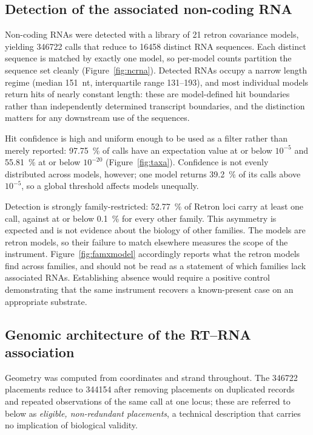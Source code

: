 \subsection{Detection of the associated non-coding RNA}
\label{sec:dbchar:ncrna}

Non-coding RNAs were detected with a library of 21 retron covariance models, yielding \num{346722}
calls that reduce to \num{16458} distinct RNA sequences. Each distinct sequence is matched by
exactly one model, so per-model counts partition the sequence set cleanly
(Figure~\ref{fig:ncrna}). Detected RNAs occupy a narrow length regime (median 151~nt, interquartile
range 131--193), and most individual models return hits of nearly constant length: these are
model-defined hit boundaries rather than independently determined transcript boundaries, and the
distinction matters for any downstream use of the sequences.

Hit confidence is high and uniform enough to be used as a filter rather than merely reported:
\SI{97.75}{\percent} of calls have an expectation value at or below $10^{-5}$ and
\SI{55.81}{\percent} at or below $10^{-20}$ (Figure~\ref{fig:taxa}). Confidence is not evenly
distributed across models, however; one model returns \SI{39.2}{\percent} of its calls above
$10^{-5}$, so a global threshold affects models unequally.

Detection is strongly family-restricted: \SI{52.77}{\percent} of Retron loci carry at least one
call, against at or below \SI{0.1}{\percent} for every other family. This asymmetry is expected and
is not evidence about the biology of other families. The models are retron models, so their failure
to match elsewhere measures the scope of the instrument. Figure~\ref{fig:famxmodel} accordingly
reports what the retron models find across families, and should not be read as a statement of which
families lack associated RNAs. Establishing absence would require a positive control demonstrating
that the same instrument recovers a known-present case on an appropriate substrate.

\subsection{Genomic architecture of the RT--RNA association}
\label{sec:dbchar:architecture}

Geometry was computed from coordinates and strand throughout. The \num{346722} placements reduce to
\num{344154} after removing placements on duplicated records and repeated observations of the same
call at one locus; these are referred to below as \emph{eligible, non-redundant placements}, a
technical description that carries no implication of biological validity.


